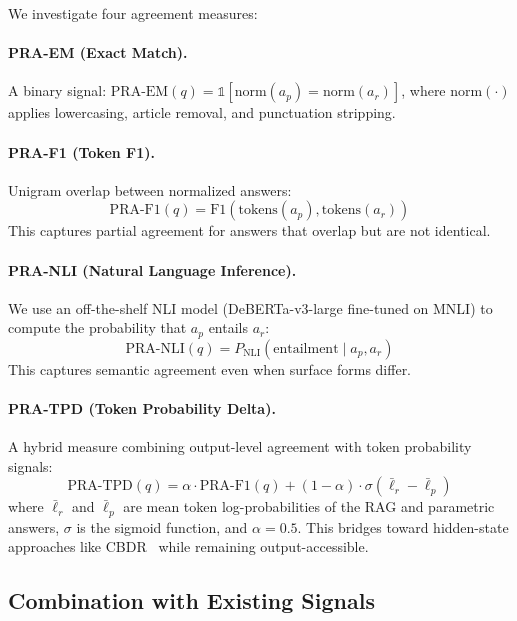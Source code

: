 \documentclass{article}
\begin{document}
We investigate four agreement measures:

\paragraph{PRA-EM (Exact Match).} A binary signal: $\text{PRA-EM}(q) = \mathbb{1}[\text{norm}(a_p) = \text{norm}(a_r)]$, where $\text{norm}(\cdot)$ applies lowercasing, article removal, and punctuation stripping.

\paragraph{PRA-F1 (Token F1).} Unigram overlap between normalized answers:
\begin{equation}
    \text{PRA-F1}(q) = \text{F1}(\text{tokens}(a_p), \text{tokens}(a_r))
\end{equation}
This captures partial agreement for answers that overlap but are not identical.

\paragraph{PRA-NLI (Natural Language Inference).} We use an off-the-shelf NLI model (DeBERTa-v3-large fine-tuned on MNLI) to compute the probability that $a_p$ entails $a_r$:
\begin{equation}
    \text{PRA-NLI}(q) = P_{\text{NLI}}(\text{entailment} \mid a_p, a_r)
\end{equation}
This captures semantic agreement even when surface forms differ.

\paragraph{PRA-TPD (Token Probability Delta).} A hybrid measure combining output-level agreement with token probability signals:
\begin{equation}
    \text{PRA-TPD}(q) = \alpha \cdot \text{PRA-F1}(q) + (1 - \alpha) \cdot \sigma\!\left(\bar{\ell}_r - \bar{\ell}_p\right)
\end{equation}
where $\bar{\ell}_r$ and $\bar{\ell}_p$ are mean token log-probabilities of the RAG and parametric answers, $\sigma$ is the sigmoid function, and $\alpha = 0.5$. This bridges toward hidden-state approaches like CBDR~\citep{ren2025cbdr} while remaining output-accessible.

\subsection{Combination with Existing Signals}
\end{document}
